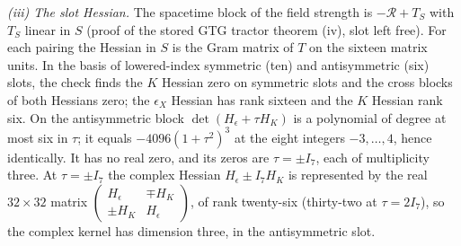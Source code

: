 \emph{(iii) The slot Hessian.} The spacetime block of the field strength is $-\mathcal{R} + T_{S}$ with $T_{S}$ linear in $S$ (proof of the stored GTG tractor theorem (iv), slot left free). For each pairing the Hessian in $S$ is the Gram matrix of $T$ on the sixteen matrix units. In the basis of lowered-index symmetric (ten) and antisymmetric (six) slots, the check finds the $K$ Hessian zero on symmetric slots and the cross blocks of both Hessians zero; the $\epsilon_{X}$ Hessian has rank sixteen and the $K$ Hessian rank six. On the antisymmetric block $\det(H_{\epsilon} + \tau H_{K})$ is a polynomial of degree at most six in $\tau$; it equals $-4096(1 + \tau^{2})^{3}$ at the eight integers $-3, \dots, 4$, hence identically. It has no real zero, and its zeros are $\tau = \pm I_{7}$, each of multiplicity three. At $\tau = \pm I_{7}$ the complex Hessian $H_{\epsilon} \pm I_{7}H_{K}$ is represented by the real $32 \times 32$ matrix $\begin{pmatrix} H_{\epsilon} & \mp H_{K} \\ \pm H_{K} & H_{\epsilon}\end{pmatrix}$, of rank twenty-six (thirty-two at $\tau = 2I_{7}$), so the complex kernel has dimension three, in the antisymmetric slot.

